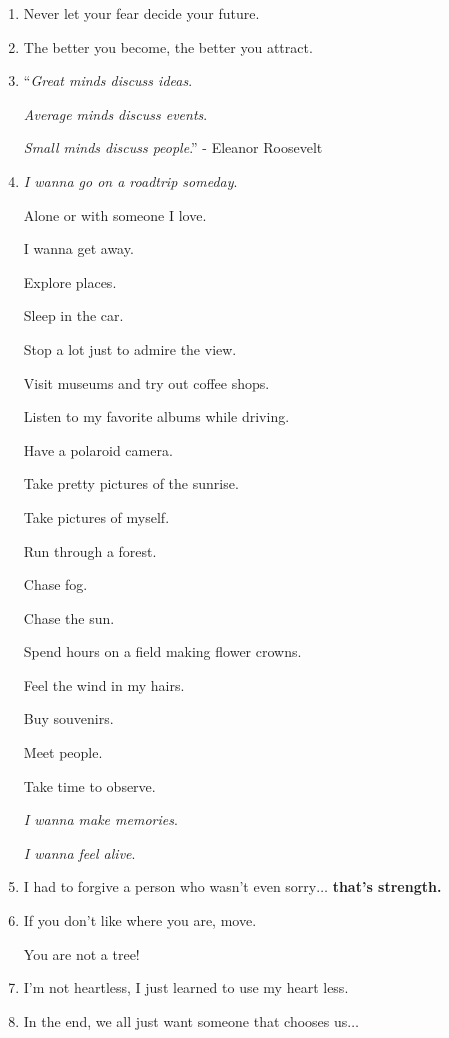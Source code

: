\documentclass{article}
\numberwithin{equation}{section}
\begin{document}
\begin{enumerate}
    They are connected to your purpose.
    
    Follow them.
    \item Never let your fear decide your future.
    \item The better you become, the better you attract.
    \item ``\textit{Great minds discuss ideas}.
    
    \textit{Average minds discuss events}.
    
    \textit{Small minds discuss people}.'' - Eleanor Roosevelt
    \item \textit{I wanna go on a roadtrip someday}.
    
    Alone or with someone I love.
    
    I wanna get away.
    
    Explore places.
    
    Sleep in the car.
    
    Stop a lot just to admire the view.
    
    Visit museums and try out coffee shops.
    
    Listen to my favorite albums while driving.
    
    Have a polaroid camera.
    
    Take pretty pictures of the sunrise.
    
    Take pictures of myself.
    
    Run through a forest.
    
    Chase fog.
    
    Chase the sun.
    
    Spend hours on a field making flower crowns.
    
    Feel the wind in my hairs.
    
    Buy souvenirs.
    
    Meet people.
    
    Take time to observe.
    
    \textit{I wanna make memories}.
    
    \textit{I wanna feel alive}.
    \item I had to forgive a person who wasn't even sorry$\ldots$ \textbf{that's strength.}
    \item If you don't like where you are, move.
    
    You are not a tree!
    \item I'm not heartless, I just learned to use my heart less.
    \item In the end, we all just want someone that chooses us$\ldots$
    

\end{enumerate}
\end{document}
